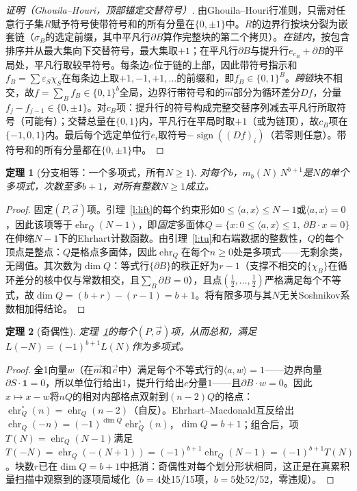\documentclass[11pt]{article}
\numberwithin{equation}{section}
\newtheorem{theorem}{定理}[section]
\theoremstyle{definition}
\theoremstyle{remark}
\begin{document}
\begin{proof}[证明（Ghouila--Houri，顶部锚定交替符号）]
由Ghouila--Houri行准则，只需对任意行子集$R$赋予符号使带符号和的所有分量在$\{0,\pm1\}$中。$R$的边界行按块分裂为嵌套链（$\sigma_B$的选定前缀，其中平凡行$\partial B$算作完整块的第二个拷贝）。\emph{在链内}，按包含排序并从最大集向下交替符号，最大集取$+1$；在平凡行$\partial B$与提升行$e_{c_B}+\partial B$的平局处，平凡行取较早符号。每条边$e$位于链的上部，因此带符号指示和$f_B=\sum\varepsilon_S\chi_S$在每条边上取$+1,-1,+1,\dots$的前缀和，即$f_B\in\{0,1\}^{B}$。\emph{跨链}块不相交，故$f=\sum_Bf_B\in\{0,1\}^{b}$全局，边界行带符号和的$\vec m$部分为循环差分$Df$，分量$f_j-f_{j-1}\in\{0,\pm1\}$。对$c_B$项：提升行的符号构成完整交替序列减去平凡行所取符号（可能有）；交替总量在$\{0,1\}$内，平凡行在平局时取$+1$（或为链顶），故$c_B$项在$\{-1,0,1\}$内。最后每个选定单位行$e_i$取符号$-\operatorname{sign}((Df)_i)$（若零则任意）。带符号和的所有分量都在$\{0,\pm1\}$中。
\end{proof}

\begin{theorem}[分支相等：一个多项式，所有$N\ge1$]\label{t:poly}
对每个$b$，$m_b(N)\,N^{b+1}$是$N$的单个多项式，次数至多$b+1$，对所有整数$N\ge1$成立。
\end{theorem}

\begin{proof}
固定$(P,\vec\sigma)$项。引理~\ref{l:lift}的每个约束形如$0\le\langle a,x\rangle\le N-1$或$\langle a,x\rangle=0$，因此该项等于$\operatorname{ehr}_Q(N-1)$，即\emph{固定}多面体$Q=\{x:0\le\langle a,x\rangle\le1,\ \partial B\cdot x=0\}$在伸缩$N-1$下的Ehrhart计数函数。由引理~\ref{l:tu}和右端数据的整数性，$Q$的每个顶点是整点：$Q$是格点多面体，因此$\operatorname{ehr}_Q$在每个$n\ge0$处是多项式——无剩余类，无阈值。其次数为$\dim Q$：等式行$\{\partial B\}$的秩正好为$r-1$（支撑不相交的$\{\chi_B\}$在循环差分的核中仅与常数相交，且$\sum_B\partial B=0$），且点$(\tfrac12,\dots,\tfrac12)$严格满足每个不等式，故$\dim Q=(b+r)-(r-1)=b+1$。将有限多项与其$N$无关Soshnikov系数相加得结论。
\end{proof}

\begin{theorem}[奇偶性]\label{t:parity}
定理~\ref{t:poly}的每个$(P,\vec\sigma)$项，从而总和，满足
$L(-N)=(-1)^{b+1}L(N)$作为多项式。
\end{theorem}

\begin{proof}
全1向量$w$（在$\vec m$和$\vec c$中）满足每个不等式行的$\langle a,w\rangle=1$——边界向量$\partial S\cdot\mathbf 1=0$，所以单位行给出$1$，提升行给出$c$分量$1$——且$\partial B\cdot w=0$。因此$x\mapsto x-w$将$nQ$的相对内部格点双射到$(n-2)Q$的格点：$\operatorname{ehr}_Q^{\circ}(n)=\operatorname{ehr}_Q(n-2)$（自反）。Ehrhart--Macdonald互反给出$\operatorname{ehr}_Q(-n)=(-1)^{\dim Q}\operatorname{ehr}_Q^{\circ}(n)$，$\dim Q=b+1$；组合后，项$T(N)=\operatorname{ehr}_Q(N-1)$满足$T(-N)=\operatorname{ehr}_Q(-(N+1))=(-1)^{b+1}\operatorname{ehr}_Q(N-1)=(-1)^{b+1}T(N)$。块数$r$已在$\dim Q=b+1$中抵消：奇偶性对每个划分形状相同，这正是在真累积量扫描中观察到的逐项局域化（$b=4$处15/15项，$b=5$处52/52，零违规）。
\end{proof}
\end{document}
